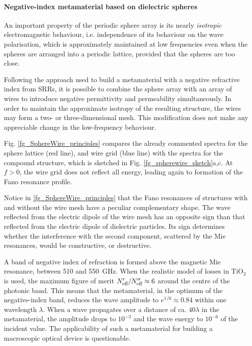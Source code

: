 \paragraph{Negative-index metamaterial based on dielectric spheres} %
An important property of the periodic sphere array is its nearly \textit{isotropic} electromagnetic behaviour, i.e. independence of its behaviour on the wave polarisation, which is approximately maintained at low frequencies even when the spheres are arranged into a periodic lattice, provided that the spheres are too close. 

Following the approach used to build a metamaterial with a negative refractive index from SRRs, it is possible to combine the sphere array with an array of wires to introduce negative permittivity and permeability simultaneously. In order to maintain the approximate isotropy of the resulting structure, the wires may form a two- or three-dimensional mesh. This modification does not make any appreciable change in the low-frequency behaviour. %

Fig. \ref{fg_SphereWire_principles} compares the already commented spectra for the sphere lattice (red line), and wire grid (blue line) with the spectra for the compound structure, which is sketched in Fig. \ref{fg_spherewire_sketch}a,c. At $f>0$, the wire grid does not reflect all energy, leading again to formation of the Fano resonance profile. 

Notice in \ref{fg_SphereWire_principles} that the Fano resonances of structures with and without the wire mesh have a peculiar complementary shape. The wave reflected from the electric dipole of the wire mesh has an opposite sign than that reflected from the electric dipole of dielectric particles. Its sign determines whether the interference with the second component, scattered by the Mie resonances, would be constructive, or destructive. 

A band of negative index of refraction is formed above the magnetic Mie resonance, between 510 and 550~GHz. When the realistic model of losses in TiO$_2$ is used, the maximum figure of merit $N_{\text{eff} }'/N_{\text{eff} }'' \approx 6$ around the centre of the photonic band. This means that the metamaterial, in the optimum of the negative-index band, reduces the wave amplitude to $e^{1/6} \approx 0.84$ within one wavelength $\lambda$. 
When a wave propagates over a distance of ca. $40\lambda$ in the metamaterial, the amplitude drops to $10^{-3}$ and the wave energy to $10^{-6}$ of the incident value. The applicability of such a metamaterial for building a macroscopic optical device is questionable. %

